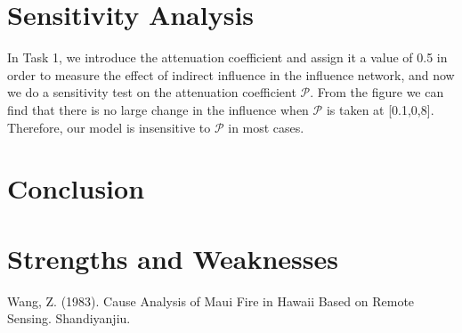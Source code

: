 \documentclass[12pt]{article}  %
\begin{document}






























\section{Sensitivity Analysis}
In Task 1, we introduce the attenuation coefficient  and assign it a value of 0.5 in order to measure the effect of indirect influence in the influence network, and now we do a sensitivity test on the attenuation coefficient $\mathcal{P}$.
From the figure we can find that there is no large change in the influence when $\mathcal{P}$ is taken at [0.1,0,8]. Therefore, our model is insensitive to $\mathcal{P}$ in most cases.




\section{Conclusion}


































\section{Strengths and Weaknesses}





















\newpage




\begin{thebibliography}{99}
	 Wang, Z. (1983). Cause Analysis of Maui Fire in Hawaii Based on Remote Sensing. Shandiyanjiu.

\end{thebibliography}
\end{document}
